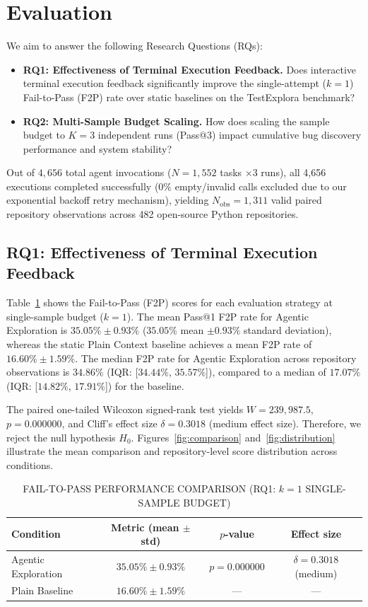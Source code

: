 \section{Evaluation}
\label{sec:results}

We aim to answer the following Research Questions (RQs):
\begin{itemize}
    \item \textbf{RQ1: Effectiveness of Terminal Execution Feedback.} Does interactive terminal execution feedback significantly improve the single-attempt ($k=1$) Fail-to-Pass (F2P) rate over static baselines on the TestExplora benchmark?
    \item \textbf{RQ2: Multi-Sample Budget Scaling.} How does scaling the sample budget to $K=3$ independent runs (Pass@3) impact cumulative bug discovery performance and system stability?
\end{itemize}

Out of $4,656$ total agent invocations ($N=1,552$ tasks $\times 3$ runs), all 4,656 executions completed successfully ($0\%$ empty/invalid calls excluded due to our exponential backoff retry mechanism), yielding $N_{\text{obs}} = 1,311$ valid paired repository observations across 482 open-source Python repositories.

\subsection{RQ1: Effectiveness of Terminal Execution Feedback}
Table~\ref{tab:rq1_results} shows the Fail-to-Pass (F2P) scores for each evaluation strategy at single-sample budget ($k=1$). The mean Pass@1 F2P rate for Agentic Exploration is $35.05\% \pm 0.93\%$ ($35.05\%$ mean $\pm 0.93\%$ standard deviation), whereas the static Plain Context baseline achieves a mean F2P rate of $16.60\% \pm 1.59\%$. The median F2P rate for Agentic Exploration across repository observations is $34.86\%$ (IQR: [$34.44\%$, $35.57\%$]), compared to a median of $17.07\%$ (IQR: [$14.82\%$, $17.91\%$]) for the baseline.

The paired one-tailed Wilcoxon signed-rank test yields $W = 239,987.5$, $p = 0.000000$, and Cliff's effect size $\delta = 0.3018$ (medium effect size). Therefore, we reject the null hypothesis $H_0$. Figures~\ref{fig:comparison} and~\ref{fig:distribution} illustrate the mean comparison and repository-level score distribution across conditions.

\begin{table}[htbp]
\caption{FAIL-TO-PASS PERFORMANCE COMPARISON (RQ1: $k=1$ SINGLE-SAMPLE BUDGET)}
\begin{center}
\begin{tabular}{|l|c|c|c|}
\hline
\textbf{Condition} & \textbf{Metric (mean $\pm$ std)} & \textbf{$p$-value} & \textbf{Effect size} \\
\hline
Agentic Exploration & $35.05\% \pm 0.93\%$ & $p = 0.000000$ & $\delta = 0.3018$ (medium) \\
Plain Baseline & $16.60\% \pm 1.59\%$ & --- & --- \\
\hline
\end{tabular}
\label{tab:rq1_results}
\end{center}
\end{table}

